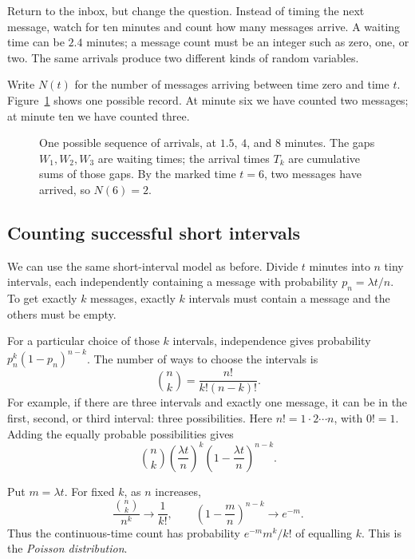 Return to the inbox, but change the question. Instead of timing the next
message, watch for ten minutes and count how many messages arrive.
A waiting time can be \(2.4\) minutes; a message count must be an integer
such as zero, one, or two. The same arrivals produce two different kinds
of random variables.

Write \(N(t)\) for the number of messages arriving between time zero and
time \(t\). Figure~\ref{fig:arrival-timeline} shows one possible record.
At minute six we have counted two messages; at minute ten we have counted
three.

\begin{figure}[htbp]
  \centering
  
  \caption{One possible sequence of arrivals, at \(1.5\), \(4\), and \(8\)
  minutes. The gaps \(W_1,W_2,W_3\) are waiting times; the arrival times
  \(T_k\) are cumulative sums of those gaps. By the marked time \(t=6\),
  two messages have arrived, so \(N(6)=2\).}
  \label{fig:arrival-timeline}
\end{figure}

\subsection{Counting successful short intervals}

We can use the same short-interval model as before. Divide \(t\) minutes
into \(n\) tiny intervals, each independently containing a message with
probability \(p_n=\lambda t/n\). To get exactly \(k\) messages, exactly
\(k\) intervals must contain a message and the others must be empty.

For a particular choice of those \(k\) intervals, independence gives
probability \(p_n^k(1-p_n)^{n-k}\). The number of ways to choose the
intervals is
\[
  \binom nk=\frac{n!}{k!(n-k)!}.
\]
For example, if there are three intervals and exactly one message, it can
be in the first, second, or third interval: three possibilities.
Here \(n!=1\cdot2\cdots n\), with \(0!=1\).
Adding the equally probable possibilities gives
\[
  \binom nk\left(\frac{\lambda t}{n}\right)^k
       \left(1-\frac{\lambda t}{n}\right)^{n-k}.
\]

Put \(m=\lambda t\). For fixed \(k\), as \(n\) increases,
\[
  \frac{\binom nk}{n^k}\longrightarrow\frac1{k!},
  \qquad
  \left(1-\frac mn\right)^{n-k}\longrightarrow e^{-m}.
\]
Thus the continuous-time count has probability
\(e^{-m}m^k/k!\) of equalling \(k\). This is the \emph{Poisson distribution}.

